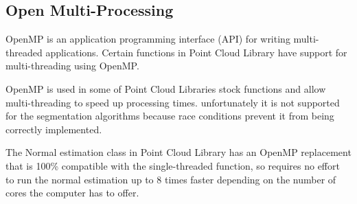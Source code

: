 	
	\subsection{Open Multi-Processing}
	OpenMP is an application programming interface (API) for writing multi-threaded applications. Certain functions in Point Cloud Library have support for multi-threading using OpenMP.
	
	OpenMP is used in some of Point Cloud Libraries stock functions and allow multi-threading to speed up processing times. unfortunately it is not supported for the segmentation algorithms because race conditions prevent it from being correctly implemented. 
	
	The Normal estimation class in Point Cloud Library has an OpenMP replacement that is 100\% compatible with the single-threaded function, so requires no effort to run the normal estimation up to 8 times faster depending on the number of cores the computer has to offer.
	

	

	

